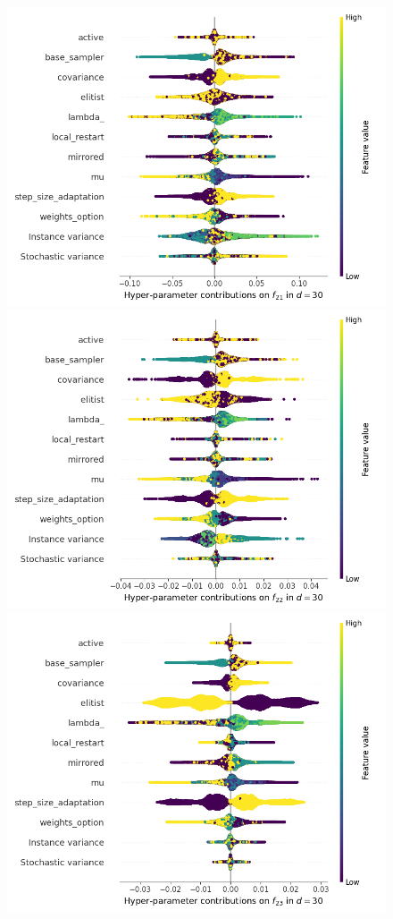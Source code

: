 \begin{figure}[t]
	\includegraphics[height=0.15\textheight,trim=0mm 0mm 30mm 0mm,clip]{cma_img_new/img_summary_f21_d30.png}
	\includegraphics[height=0.15\textheight,trim=60mm 0mm 30mm 0mm,clip]{cma_img_new/img_summary_f22_d30.png}
	\includegraphics[height=0.15\textheight,trim=60mm 0mm 30mm 0mm,clip]{cma_img_new/img_summary_f23_d30.png}

\end{figure}
